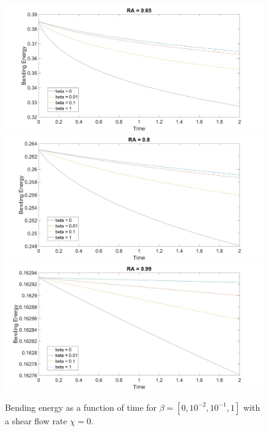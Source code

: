 \documentclass[aps,prl,showpacs]{revtex4}
\begin{document}
 
 \begin{figure}
 	\centering
 	\includegraphics[width=.9\textwidth]{figures/BE1.jpg}
 	\includegraphics[width=.9\textwidth]{figures/BE2.jpg}
 	\includegraphics[width=.9\textwidth]{figures/BE3.jpg}
 	\caption{Bending energy as a function of time for $\beta = [0, 10^{-2},10^{-1}, 1]$ with a shear flow rate $\chi = 0$.}
 	\label{Shear0}
 \end{figure}
 
\end{document}
